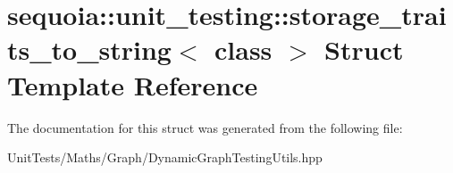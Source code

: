 \hypertarget{structsequoia_1_1unit__testing_1_1storage__traits__to__string}{}\section{sequoia\+::unit\+\_\+testing\+::storage\+\_\+traits\+\_\+to\+\_\+string$<$ class $>$ Struct Template Reference}
\label{structsequoia_1_1unit__testing_1_1storage__traits__to__string}


The documentation for this struct was generated from the following file\+:\begin{DoxyCompactItemize}
\item 
Unit\+Tests/\+Maths/\+Graph/Dynamic\+Graph\+Testing\+Utils.\+hpp\end{DoxyCompactItemize}

